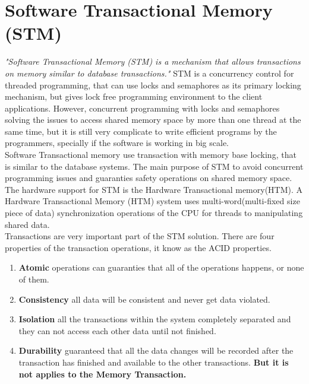 \documentclass[12pt]{article}
\begin{document}
\clearpage

\section{Software Transactional Memory (STM)}
\textit{"Software Transactional Memory (STM) is a mechanism that allows transactions on memory similar to database transactions."}\cite{Haskell}
STM is a concurrency control for threaded programming, that can use locks and semaphores as its primary locking mechanism, but gives lock free programming environment to the client applications. However, concurrent programming with locks and semaphores solving the issues to access shared memory space by more than one thread at the same time, but it is still very complicate to write efficient programs by the programmers, specially if the software is working in big scale.\\

Software Transactional memory use transaction with memory base locking, that is similar to the database systems. The main purpose of STM to avoid concurrent programming issues and guaranties safety operations on shared memory space.\cite{Kasper}\\

The hardware support for STM is the Hardware Transactional memory(HTM).
A Hardware Transactional Memory (HTM) system uses multi-word(multi-fixed size piece of data) synchronization operations of the CPU for threads to manipulating shared data.\\

{\setlength{\parindent}{0cm}
Transactions are very important part of the STM solution.  
There are four properties of the transaction operations, it know as the ACID properties.}
\begin{enumerate}
\item \textbf{Atomic} operations can guaranties that all of the operations happens, or none of them.
\item \textbf{Consistency} all data will be consistent and never get data violated.
\item \textbf{Isolation} all the transactions within the system completely separated and they can not access each other data until not finished. 
\item \textbf{Durability} guaranteed that all the data changes will be recorded after the transaction has finished and available to the other transactions. \textbf{But it is not applies to the Memory Transaction.}
\end{enumerate}
\end{document}
